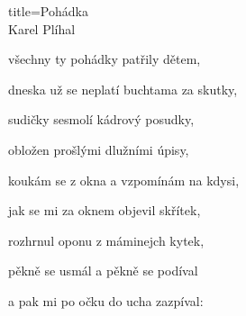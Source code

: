 \begin{song}{title=\predtitle\centering Pohádka \\\large Karel Plíhal\vspace*{-0.9cm}}
\begin{centerjustified}
všechny ty pohádky patřily dětem,

dneska už se neplatí buchtama za skutky,

sudičky sesmolí kádrový posudky,

obložen prošlými dlužními úpisy,

koukám se z okna a vzpomínám na kdysi,

jak se mi za oknem objevil skřítek,

rozhrnul oponu z máminejch kytek,

pěkně se usmál a pěkně se podíval

a pak mi po očku do ucha zazpíval:







\end{centerjustified}
\setcounter{Slokočet}{0}
\end{song}
